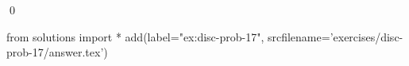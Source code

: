 
\begin{ex} 
  \label{ex:disc-prob-17}
  
  \qed
\end{ex} 
\begin{python0}
from solutions import *
add(label="ex:disc-prob-17",
    srcfilename='exercises/disc-prob-17/answer.tex') 
\end{python0}
